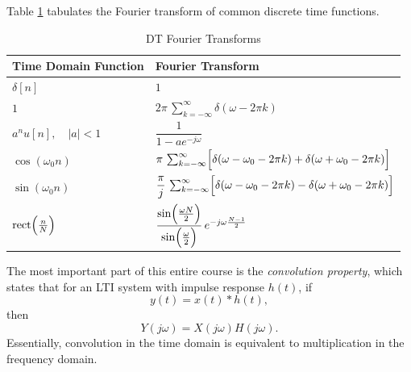 Table \ref{tab:dtfourier_transforms} tabulates the
Fourier transform of common discrete time functions.

\begin{table}[ht]
    \centering
    \caption{DT Fourier Transforms}
    \label{tab:dtfourier_transforms}
    \begin{tabular}{ll}
        \toprule
        \textbf{Time Domain Function}          & \textbf{Fourier Transform}                                                                                             \\
        \midrule
        $\delta[n]$                            & $1$                                                                                                                    \\[1mm]
        $1$                                    & $2\pi\,\sum_{k=-\infty}^{\infty}\delta(\omega-2\pi k)$                                                                 \\[1mm]
        $a^n u[n],\quad |a|<1$                 & $\dfrac{1}{1-ae^{-j\omega}}$                                                                                           \\[1mm]
        $\cos(\omega_0 n)$                     & $\pi\,\sum_{k=-\infty}^{\infty}\Bigl[\delta(\omega-\omega_0-2\pi k) + \delta(\omega+\omega_0-2\pi k)\Bigr]$            \\[1mm]
        $\sin(\omega_0 n)$                     & $\dfrac{\pi}{j}\,\sum_{k=-\infty}^{\infty}\Bigl[\delta(\omega-\omega_0-2\pi k) - \delta(\omega+\omega_0-2\pi k)\Bigr]$ \\[1mm]
        $\mathrm{rect}\Bigl(\frac{n}{N}\Bigr)$ & $\dfrac{\sin\Bigl(\frac{\omega N}{2}\Bigr)}{\sin\Bigl(\frac{\omega}{2}\Bigr)}\,e^{-j\omega\frac{N-1}{2}}$              \\
        \bottomrule
    \end{tabular}
\end{table}

The most important part of this entire course is the \emph{convolution property}, which states that 
for an LTI system with impulse response $h(t)$, if 
\begin{equation}
    y(t) = x(t) * h(t),
\end{equation}
then
\begin{equation}
    Y(j\omega) = X(j\omega)H(j\omega).
\end{equation}
Essentially, convolution in the time domain is equivalent to multiplication in the frequency domain. 